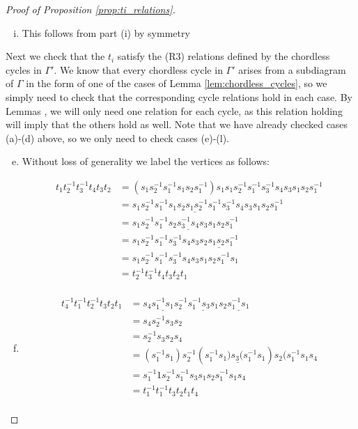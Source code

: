 \documentclass[11pt]{amsart}
\theoremstyle{definition}
\begin{document}
\begin{proof}[Proof of Proposition \ref{prop:ti_relations}]
\begin{enumerate}[a)]
\begin{enumerate}[i)]
\item This follows from part (i) by symmetry
\end{enumerate}
\end{enumerate}

Next we check that the $t_i$ satisfy the (R3) relations defined by the chordless cycles in $\Gamma'$.  We know that every chordless cycle in $\Gamma'$ arises from a subdiagram of $\Gamma$ in the form of one of the cases of Lemma \ref{lem:chordless_cycles}, so we simply need to check that the corresponding cycle relations hold in each case.  By Lemmas , we will only need one relation for each cycle, as this relation holding will imply that the others hold as well.  Note that we have already checked cases (a)-(d) above, so we only need to check cases (e)-(l).

\begin{enumerate}[a)]
\setcounter{enumi}{4}
\item
Without loss of generality we label the vertices as follows:

\begin{align*}
t_1t_2^{-1}t_3^{-1}t_4t_3t_2 &= (s_1s_2^{-1}s_1^{-1}s_1s_2s_1^{-1})s_1s_1s_2^{-1}s_1^{-1}s_3^{-1}s_4s_3s_1s_2s_1^{-1}\\
&= s_1s_2^{-1}s_1^{-1}\underline{s_1s_2s_1s_2^{-1}s_1^{-1}}s_3^{-1}s_4s_3s_1s_2s_1^{-1}\\
&= s_1s_2^{-1}s_1^{-1}\underline{s_2s_3^{-1}s_4s_3}s_1s_2s_1^{-1}\\
&= s_1s_2^{-1}s_1^{-1}s_3^{-1}s_4s_3\underline{s_2s_1s_2s_1^{-1}}\\
&= s_1s_2^{-1}s_1^{-1}s_3^{-1}s_4s_3s_1s_2s_1^{-1}s_1\\
&= t_2^{-1}t_3^{-1}t_4t_3t_2t_1\\
\end{align*}

\item
\begin{align*}
t_4^{-1}t_1^{-1}t_2^{-1}t_3t_2t_1 &= s_4\underline{s_1^{-1}s_1}s_2^{-1}\underline{s_1^{-1}s_3s_1}s_2 \underline{s_1^{-1}s_1}\\
&= s_4s_2^{-1}s_3s_2\\
&= s_2^{-1}s_3s_2s_4\\
&= (s_1^{-1}s_1)s_2^{-1}(s_1^{-1}\underline{s_1)s_3(s_1^{-1}}s_1)s_2(s_1^{-1}s_1s_4\\
&= s_1^{-1}1s_2^{-1}s_1^{-1}s_3s_1s_2s_1^{-1}s_1s_4\\
&= t_1^{-1}t_1^{-1}t_3t_2t_1t_4\\
\end{align*}


\end{enumerate}
\end{proof}
\end{document}

